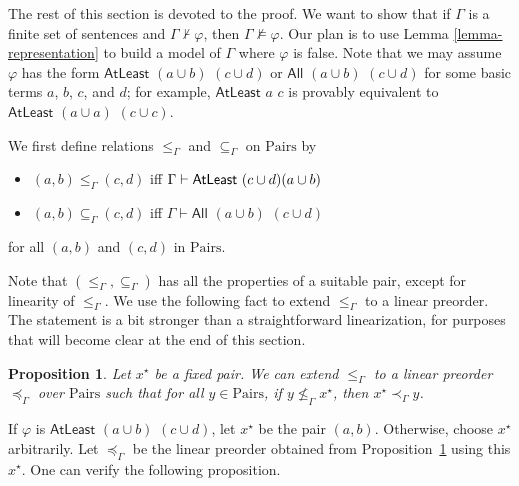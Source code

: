 \documentclass[letterpaper]{article} %
\newtheorem{proposition}[theorem]{Proposition}
\theoremstyle{definition}
\newcommand{\proves}{\vdash}
\newcommand{\All}[2]{\mathsf{All}\,\,#1\,\,#2}
\newcommand{\Atleast}[2]{\mathsf{AtLeast}\,\,#1\,\,#2}
\newcommand{\Pairs}{\mbox{Pairs}}
\newcommand{\provsub}{\subseteq_{\Gamma}}
\newcommand{\provle}{\le_{\Gamma}}
\newcommand{\provextended}{\preceq_{\Gamma}}
\newcommand{\provextendedstrict}{\prec_{\Gamma}}
\begin{document}
The rest of this section is devoted to the proof.  We want to show that if $\Gamma$ is a finite set of sentences and $\Gamma \not \proves \varphi$, then $\Gamma \not \models \varphi$.  Our plan is to use Lemma \ref{lemma-representation} to build a model of $\Gamma$ where $\varphi$ is false. Note that we may assume $\varphi$ has the form $\Atleast{(a\cup b)}{(c\cup d)}$ or $\All{(a\cup b)}{(c\cup d)}$ for some basic terms $a$, $b$, $c$, and $d$; for example, $\Atleast{a}{c}$ is provably equivalent to $\Atleast{(a\cup a)}{(c\cup c)}$.

We first define relations $\provle$ and $\provsub$ on $\Pairs$ by

\begin{itemize}%
    \item $(a,b) \provle (c,d)$ iff $\Gamma \vdash  \Atleast{(c \cup d){(a \cup b)}}$
    
    \item $(a,b) \provsub (c,d)$ iff $\Gamma \vdash \All{(a \cup b)}{(c \cup d)}$
\end{itemize}
for all $(a,b)$ and  $(c,d)$ in $\Pairs$.  


Note that $(\provle, \provsub)$ has all the properties of a suitable pair, except for linearity of $\provle$.  We use the following fact to extend $\provle$ to a linear preorder.  The statement is a bit stronger than a straightforward linearization, for purposes that will become clear at the end of this section.  %

\begin{proposition}
\label{proposition-linearization}
Let $x^\star$ be a fixed pair.  We can extend $\provle$ to a linear preorder $\provextended$ over $\Pairs$ such that for all $y \in \Pairs$, if $y \not \provle x^\star$, then $x^\star \provextendedstrict y$.
\end{proposition}

If $\varphi$ is $\Atleast{(a \cup b)}{(c \cup d)}$, let $x^\star$ be the pair $(a, b)$. Otherwise, choose $x^\star$ arbitrarily. Let $\provextended$ be the linear preorder obtained from Proposition~\ref{proposition-linearization} using this $x^\star$.  One can verify the following proposition. %
\end{document}
